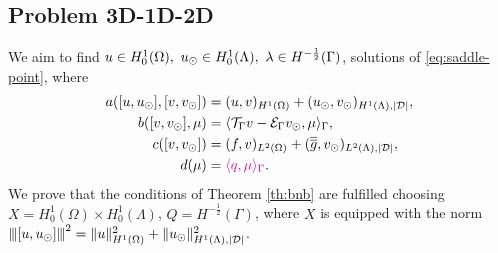 \documentclass[r]{siamart171218}
\newcommand{\paolo}[1]{{\color{magenta}#1}}
\begin{document}
\subsection{Problem 3D-1D-2D}
We aim to find $u \in H^1_0(\Omega),\ u_{\odot} \in H_0^1(\Lambda), \ \lambda \in H^{-\frac12}(\Gamma )$,
solutions of \eqref{eq:saddle-point}, where
\begin{align*}
a([u, \ud], [v, \vd])&= (u,v)_{H^1(\Omega)} + (\ud,\vd)_{H^1(\Lambda),|\D|},
\\
b([v, \vd], \mu)&= \langle \trace v - \ext \vd , \mu \rangle_\Gamma,
\\
c([v,\vd])&= (f,v)_{L^2(\Omega)} + (\avrd{g},\vd)_{L^2(\Lambda),|\D|},
\\
d(\mu)&=\paolo{\langle q,\mu\rangle_\Gamma}.
\end{align*}
We prove that the conditions of Theorem \ref{th:bnb} are fulfilled choosing 
$X=H^1_0(\Omega) \times H^1_0(\Lambda)$, $Q=H^{-\frac 12}(\Gamma)$, where $X$  is equipped with the norm ${\left\vert\kern-0.25ex\left\vert\kern-0.25ex\left\vert [u,u_{\odot} ] \right\vert\kern-0.25ex\right\vert\kern-0.25ex\right\vert}^2=\|u\|^2_{H^1(\Omega)} + \|u_{\odot}\|^2_{H^1(\Lambda),|\mathcal{D}|}$.
\end{document}
